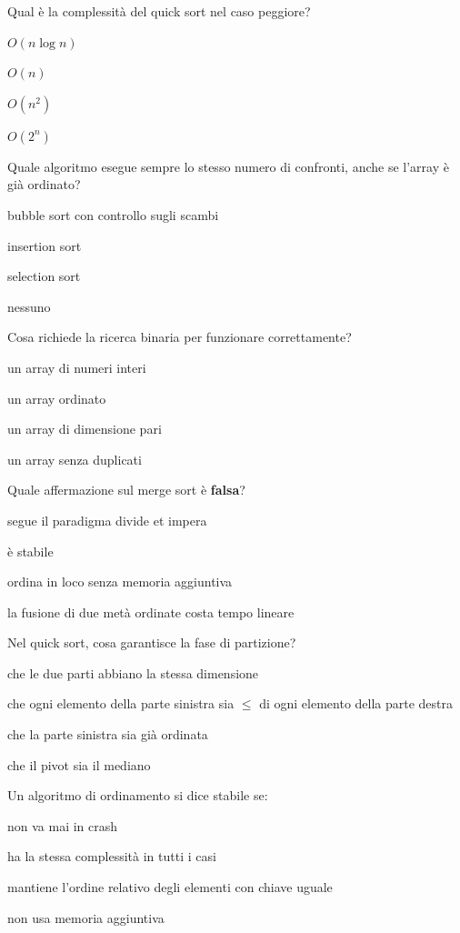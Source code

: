 \begin{quiz}{Qual è la complessità del quick sort nel caso peggiore?}
  \item $O(n \log n)$
  \item $O(n)$
  \item $O(n^2)$
  \item $O(2^n)$
\end{quiz}

\begin{quiz}{Quale algoritmo esegue sempre lo stesso numero di confronti, anche se l'array è già ordinato?}
  \item bubble sort con controllo sugli scambi
  \item insertion sort
  \item selection sort
  \item nessuno
\end{quiz}

\begin{quiz}{Cosa richiede la ricerca binaria per funzionare correttamente?}
  \item un array di numeri interi
  \item un array ordinato
  \item un array di dimensione pari
  \item un array senza duplicati
\end{quiz}

\begin{quiz}{Quale affermazione sul merge sort è \textbf{falsa}?}
  \item segue il paradigma divide et impera
  \item è stabile
  \item ordina in loco senza memoria aggiuntiva
  \item la fusione di due metà ordinate costa tempo lineare
\end{quiz}

\begin{quiz}{Nel quick sort, cosa garantisce la fase di partizione?}
  \item che le due parti abbiano la stessa dimensione
  \item che ogni elemento della parte sinistra sia $\le$ di ogni elemento della parte destra
  \item che la parte sinistra sia già ordinata
  \item che il pivot sia il mediano
\end{quiz}

\begin{quiz}{Un algoritmo di ordinamento si dice stabile se:}
  \item non va mai in crash
  \item ha la stessa complessità in tutti i casi
  \item mantiene l'ordine relativo degli elementi con chiave uguale
  \item non usa memoria aggiuntiva
\end{quiz}


